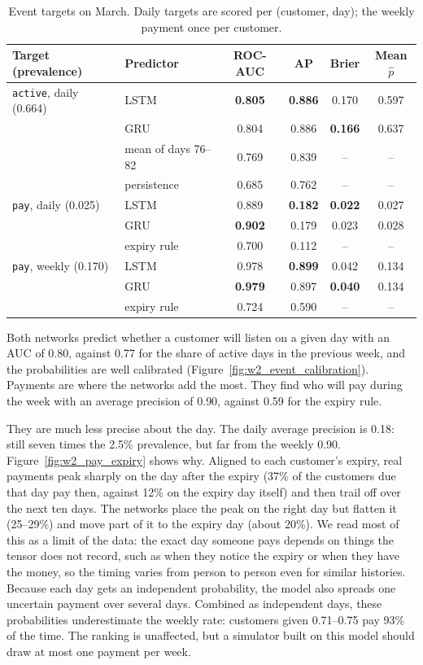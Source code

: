 \documentclass{article}
\begin{document}
\begin{table}[H]
\centering
\renewcommand{\arraystretch}{1.25}
\begin{tabular}{|l|l|c|c|c|c|}
\hline
\textbf{Target (prevalence)} & \textbf{Predictor} & \textbf{ROC-AUC} & \textbf{AP} & \textbf{Brier} & \textbf{Mean $\hat p$} \\ \hline
\texttt{active}, daily (0.664) & LSTM & \textbf{0.805} & \textbf{0.886} & 0.170 & 0.597 \\ \hline
 & GRU & 0.804 & 0.886 & \textbf{0.166} & 0.637 \\ \hline
 & mean of days 76--82 & 0.769 & 0.839 & -- & -- \\ \hline
 & persistence & 0.685 & 0.762 & -- & -- \\ \hline
\texttt{pay}, daily (0.025) & LSTM & 0.889 & \textbf{0.182} & \textbf{0.022} & 0.027 \\ \hline
 & GRU & \textbf{0.902} & 0.179 & 0.023 & 0.028 \\ \hline
 & expiry rule & 0.700 & 0.112 & -- & -- \\ \hline
\texttt{pay}, weekly (0.170) & LSTM & 0.978 & \textbf{0.899} & 0.042 & 0.134 \\ \hline
 & GRU & \textbf{0.979} & 0.897 & \textbf{0.040} & 0.134 \\ \hline
 & expiry rule & 0.724 & 0.590 & -- & -- \\ \hline
\end{tabular}
\caption{Event targets on March. Daily targets are scored per (customer, day); the weekly payment once per customer.}
\label{tab:w2_traj_events}
\end{table}

Both networks predict whether a customer will listen on a given day with an AUC of 0.80, against 0.77 for the share of active days in the previous week, and the probabilities are well calibrated (Figure~\ref{fig:w2_event_calibration}). Payments are where the networks add the most. They find who will pay during the week with an average precision of 0.90, against 0.59 for the expiry rule.

\label{sec:w2_pay_timing}They are much less precise about the day. The daily average precision is 0.18: still seven times the 2.5\% prevalence, but far from the weekly 0.90. Figure~\ref{fig:w2_pay_expiry} shows why. Aligned to each customer's expiry, real payments peak sharply on the day after the expiry (37\% of the customers due that day pay then, against 12\% on the expiry day itself) and then trail off over the next ten days. The networks place the peak on the right day but flatten it (25--29\%) and move part of it to the expiry day (about 20\%). We read most of this as a limit of the data: the exact day someone pays depends on things the tensor does not record, such as when they notice the expiry or when they have the money, so the timing varies from person to person even for similar histories. Because each day gets an independent probability, the model also spreads one uncertain payment over several days. Combined as independent days, these probabilities underestimate the weekly rate: customers given 0.71--0.75 pay 93\% of the time. The ranking is unaffected, but a simulator built on this model should draw at most one payment per week.
\end{document}
